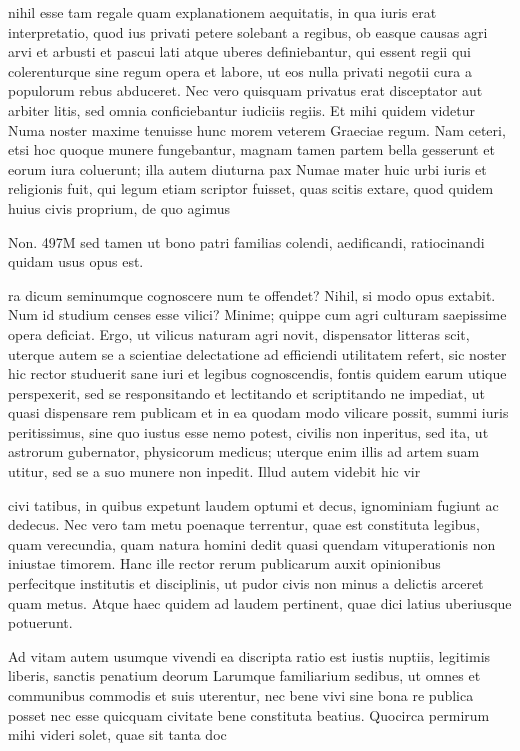  nihil esse tam regale quam explanationem aequitatis, in qua iuris erat interpretatio, quod ius privati petere solebant a regibus, ob easque causas agri arvi et arbusti et pascui lati atque uberes definiebantur, qui essent regii qui colerenturque sine regum opera et labore, ut eos nulla privati negotii cura a populorum rebus abduceret. Nec vero quisquam privatus erat disceptator aut arbiter litis, sed omnia conficiebantur iudiciis regiis. Et mihi quidem videtur Numa noster maxime tenuisse hunc morem veterem Graeciae regum. Nam ceteri, etsi hoc quoque munere fungebantur, magnam tamen partem bella gesserunt et eorum iura coluerunt; illa autem diuturna pax Numae mater huic urbi iuris et religionis fuit, qui legum etiam scriptor fuisset, quas scitis extare, quod quidem huius civis proprium, de quo agimus

 Non. 497M sed tamen ut bono patri familias colendi, aedificandi, ratiocinandi quidam usus opus est.

 ra dicum seminumque cognoscere num te offendet? Nihil, si modo opus extabit. Num id studium censes esse vilici? Minime; quippe cum agri culturam saepissime opera deficiat. Ergo, ut vilicus naturam agri novit, dispensator litteras scit, uterque autem se a scientiae delectatione ad efficiendi utilitatem refert, sic noster hic rector studuerit sane iuri et legibus cognoscendis, fontis quidem earum utique perspexerit, sed se responsitando et lectitando et scriptitando ne impediat, ut quasi dispensare rem publicam et in ea quodam modo vilicare possit, summi iuris peritissimus, sine quo iustus esse nemo potest, civilis non inperitus, sed ita, ut astrorum gubernator, physicorum medicus; uterque enim illis ad artem suam utitur, sed se a suo munere non inpedit. Illud autem videbit hic vir

 civi tatibus, in quibus expetunt laudem optumi et decus, ignominiam fugiunt ac dedecus. Nec vero tam metu poenaque terrentur, quae est constituta legibus, quam verecundia, quam natura homini dedit quasi quendam vituperationis non iniustae timorem. Hanc ille rector rerum publicarum auxit opinionibus perfecitque institutis et disciplinis, ut pudor civis non minus a delictis arceret quam metus. Atque haec quidem ad laudem pertinent, quae dici latius uberiusque potuerunt.

 Ad vitam autem usumque vivendi ea discripta ratio est iustis nuptiis, legitimis liberis, sanctis penatium deorum Larumque familiarium sedibus, ut omnes et communibus commodis et suis uterentur, nec bene vivi sine bona re publica posset nec esse quicquam civitate bene constituta beatius. Quocirca permirum mihi videri solet, quae sit tanta doc

